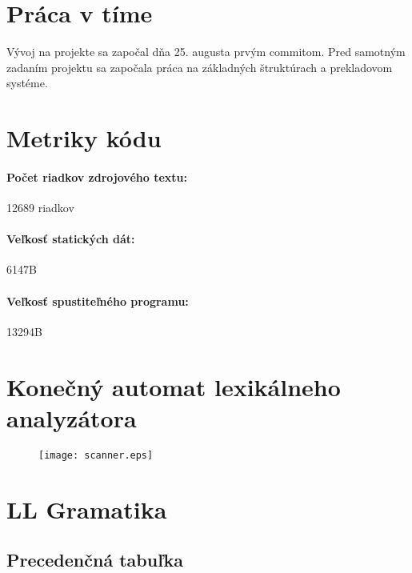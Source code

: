 \documentclass[12pt,a4paper,titlepage,final]{article}
\begin{document}
\section{Práca v tíme}
Vývoj na projekte sa započal dňa 25. augusta prvým commitom. Pred samotným
zadaním projektu sa započala práca na základných štruktúrach a prekladovom
systéme.


\appendix

\section{Metriky kódu} \label{metriky}
\paragraph{Počet riadkov zdrojového textu:} 12689 riadkov
\paragraph{Veľkosť statických dát:} 6147B
\paragraph{Veľkosť spustiteľného programu:} 13294B

\section{Konečný automat lexikálneho analyzátora}\label{chap:scanner}

\begin{figure}[H]
\begin{center}
	\texttt{[image: scanner.eps]}
	\label{fig:scanner}
\end{center}
\end{figure}

%
\section{LL Gramatika} \label{gramatika}



%
\clearpage
\begin{landscape}
	\section{Precedenčná tabuľka} \label{precedencna_tabulka}
	
\end{landscape}
\clearpage
\newpage
\end{document}
